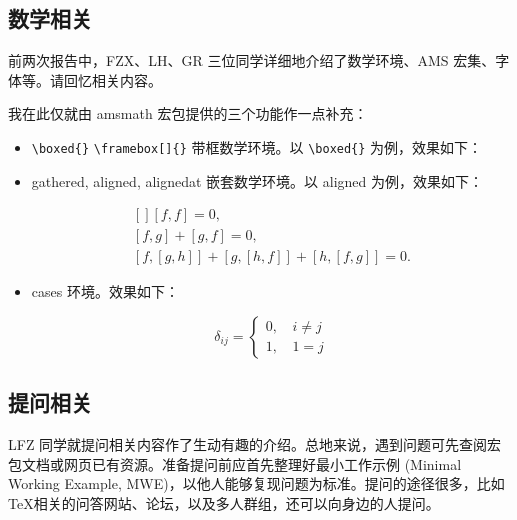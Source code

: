 \subsection{数学相关}
前两次报告中，FZX、LH、GR 三位同学详细地介绍了数学环境、AMS 宏集、字体等。请回忆相关内容。

我在此仅就由 amsmath 宏包提供的三个功能作一点补充：
\begin{itemize}
\item \verb|\boxed{}| \verb|\framebox[]{}| 带框数学环境。以 \verb|\boxed{}| 为例，效果如下：
\begin{vertlst}

\boxed{\e^{\iu \theta} = \cos{\theta} + \iu \sin{\theta}}
\end{vertlst}
\item \textsf{gathered}, \textsf{aligned}, \textsf{alignedat} 嵌套数学环境。以 aligned 为例，效果如下：
\begin{vertlst}

\small
\begin{equation}
\begin{gathered}[]
  [f, f] = 0, \\
  [f, g] + [g, f] = 0, \\
  [f, [g, h]] + [g, [h, f]] + [h, [f, g]] = 0.
\end{gathered}
\end{equation} 
\end{vertlst}
\item cases 环境。效果如下：
\begin{sidelst}
\begin{equation}
  \delta_{ij} =
  \begin{cases}
    0, \, & i \ne j \\
    1, & 1 = j
  \end{cases}
\end{equation}
\end{sidelst}
\end{itemize}

\subsection{提问相关}
LFZ 同学就提问相关内容作了生动有趣的介绍。总地来说，遇到问题可先查阅宏包文档或网页已有资源。准备提问前应首先整理好最小工作示例 (Minimal Working Example, MWE)，以他人能够复现问题为标准。提问的途径很多，比如 \TeX 相关的问答网站、论坛，以及多人群组，还可以向身边的人提问。